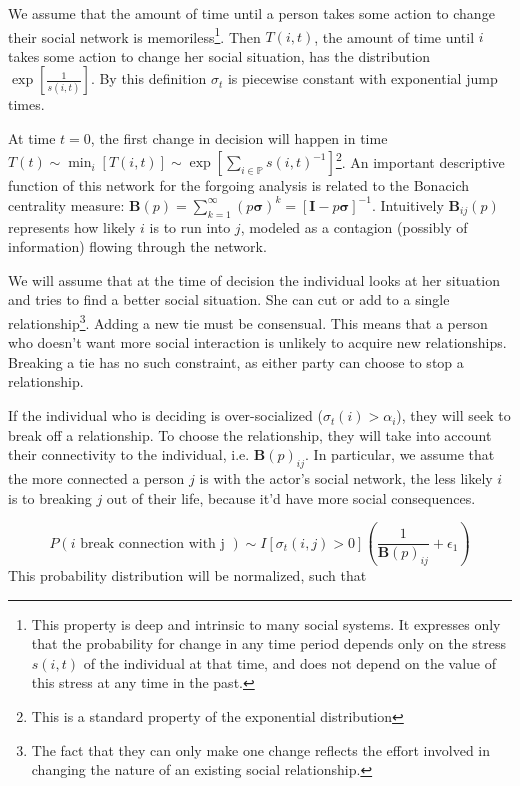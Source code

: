 \documentclass[]{article}
\begin{document}
	We assume that the amount of time until a person takes some action to change their social network is memoriless\footnote{This property is deep and intrinsic to many social systems. It expresses only that the probability for change in any time period depends only on the stress $s(i,t)$ of the individual at that time, and does not depend on the value of this stress at any time in the past.}. Then $T(i, t)$, the amount of time until $i$ takes some action to change her social situation, has the distribution $\exp\left[ \frac{1}{s(i,t)} \right]$. By this definition $\sigma_t$ is piecewise constant with exponential jump times.
	
	At time $t=0$, the first change in decision will happen in time $T(t) \sim \min_i[T(i,t)] \sim \exp\left[ \sum_{i\in\mathbb{P}} s(i,t)^{-1} \right]$\footnote{This is a standard property of the exponential distribution}. An important descriptive function of this network for the forgoing analysis is related to the Bonacich centrality measure: $\textbf{B}(p) = \sum_{k=1}^{\infty} (p \boldsymbol{\sigma})^k = [\textbf{I} - p\boldsymbol{\sigma}]^{-1}$. Intuitively $\textbf{B}_{ij}(p)$ represents how likely $i$ is to run into $j$, modeled as a contagion (possibly of information) flowing through the network. 
	
	We will assume that at the time of decision the individual looks at her situation and tries to find a better social situation. 
	She can cut or add to a single relationship\footnote{The fact that they can only make one change reflects the effort involved in changing the nature of an existing social relationship.}.
	Adding a new tie must be consensual. This means that a person who doesn't want more social interaction is unlikely to acquire new relationships.
	Breaking a tie has no such constraint, as either party can choose to stop a relationship.
	
	If the individual who is deciding is over-socialized ($\sigma_t(i) > \alpha_i$), they will seek to break off a relationship.
	To choose the relationship, they will take into account their connectivity to the individual, i.e. $\textbf{B}(p)_{ij}$. In particular, we assume that the more connected a person $j$ is with the actor's social network, the less likely $i$ is to breaking $j$ out of their life, because it'd have more social consequences.
	
	\[
	P(i\text{ break connection with j }) \sim 
		I[\sigma_t(i,j) > 0] \left(
			\frac{1}{\textbf{B}(p)_{ij}} + \epsilon_1
		\right)
	\]
	This probability distribution will be normalized, such that 
	
\end{document}
